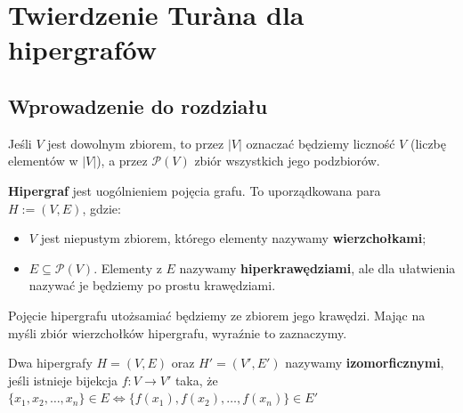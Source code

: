 \documentclass[miz,woman]{mgrwms}
\begin{document}

\chapter{Twierdzenie Tur\`{a}na dla hipergrafów}
\section{Wprowadzenie do rozdziału}

Jeśli $V$ jest dowolnym zbiorem, to przez $|V|$ oznaczać będziemy liczność $V$ (liczbę elementów w $|V|$),
a przez $\mathcal{P}(V)$ zbiór wszystkich jego podzbiorów.\\
\begin{defi}
 \textbf{Hipergraf} jest uogólnieniem pojęcia grafu. To uporządkowana para \\
$H:=(V,E)$, gdzie:
\begin{itemize}
\item $V$ jest niepustym zbiorem, którego elementy nazywamy \textbf{wierzchołkami};
\item $E \subseteq \mathcal{P}(V)$. Elementy z $E$ nazywamy \textbf{hiperkrawędziami}, ale  dla ułatwienia nazywać je będziemy
po prostu krawędziami.
\end{itemize}
\end{defi}
Pojęcie hipergrafu utożsamiać będziemy ze zbiorem jego krawędzi. Mając na myśli zbiór wierzchołków hipergrafu, wyraźnie
to zaznaczymy. \\
\begin{defi}
 Dwa hipergrafy $H=(V,E)$ oraz $H'=(V',E')$ nazywamy \textbf{izomorficznymi}, jeśli istnieje bijekcja $f:V\rightarrow V'$
taka, że $\{x_1,x_2,\dots,x_n\} \in E \Longleftrightarrow \{f(x_1),f(x_2),\dots,f(x_n)\} \in E'$
\end{defi}
\end{document}
